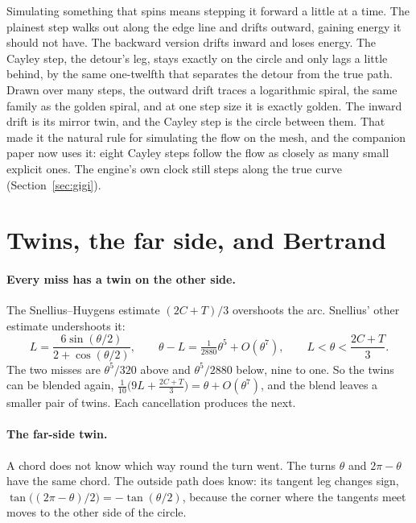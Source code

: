 \documentclass[11pt]{article}
\begin{document}
\begin{plain}
Simulating something that spins means stepping it forward a little at a time. The plainest
step walks out along the edge line and drifts outward, gaining energy it should not have.
The backward version drifts inward and loses energy. The Cayley step, the detour's leg, stays
exactly on the circle and only lags a little behind, by the same one-twelfth that separates
the detour from the true path. Drawn over many steps, the outward drift traces a logarithmic
spiral, the same family as the golden spiral, and at one step size it is exactly golden. The
inward drift is its mirror twin, and the Cayley step is the circle between them. That made
it the natural rule for simulating the flow on the mesh, and the companion paper now uses
it: eight Cayley steps follow the flow as closely as many small explicit ones. The engine's
own clock still steps along the true curve (Section~\ref{sec:gigi}).
\end{plain}

\section{Twins, the far side, and Bertrand}\label{sec:twins}

\paragraph{Every miss has a twin on the other side.} The Snellius--Huygens estimate
$(2C+T)/3$ overshoots the arc. Snellius' other estimate undershoots it:
\[
L=\frac{6\sin(\theta/2)}{2+\cos(\theta/2)},\qquad
\theta-L=\tfrac{1}{2880}\theta^5+O(\theta^7),\qquad L<\theta<\frac{2C+T}{3}.
\]
The two misses are $\theta^5/320$ above and $\theta^5/2880$ below, nine to one. So the twins
can be blended again, $\tfrac{1}{10}\bigl(9L+\tfrac{2C+T}{3}\bigr)=\theta+O(\theta^7)$, and the
blend leaves a smaller pair of twins. Each cancellation produces the next.

\paragraph{The far-side twin.} A chord does not know which way round the turn went. The
turns $\theta$ and $2\pi-\theta$ have the same chord. The outside path does know: its
tangent leg changes sign, $\tan\bigl((2\pi-\theta)/2\bigr)=-\tan(\theta/2)$, because the
corner where the tangents meet moves to the other side of the circle.
\end{document}
